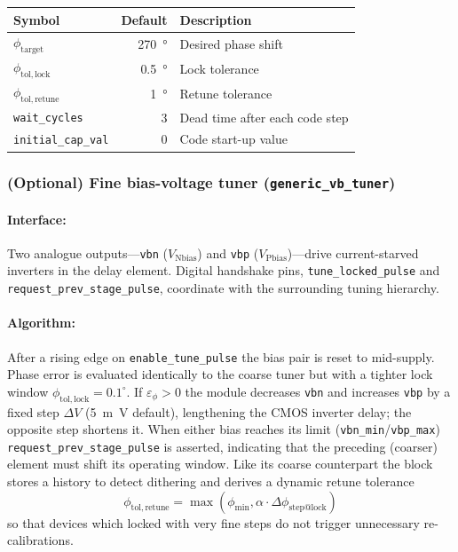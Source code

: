 \begin{center}
\begin{tabular}{@{}lrl@{}}
\toprule
Symbol & Default & Description\\
\midrule
\(\phi_\mathrm{target}\)              & \SI{270}{\degree} & Desired phase shift\\
\(\phi_\mathrm{tol,lock}\)            & \SI{0.5}{\degree} & Lock tolerance\\
\(\phi_\mathrm{tol,retune}\)          & \SI{1}{\degree}   & Retune tolerance \\[2pt]
\texttt{wait\_cycles}                 & 3                 & Dead time after each code step\\
\texttt{initial\_cap\_val}            & 0                 & Code start-up value\\
\bottomrule
\end{tabular}
\end{center}

\subsubsection{(Optional) Fine bias-voltage tuner (\texttt{generic\_vb\_tuner})}
\paragraph{Interface:}

Two analogue outputs—\texttt{vbn} (\(V_\mathrm{N bias}\)) and \texttt{vbp} (\(V_\mathrm{P bias}\))—drive current-starved inverters in the delay element.
Digital handshake pins, \texttt{tune\_locked\_pulse} and
\texttt{request\_prev\_stage\_pulse}, coordinate with the surrounding
tuning hierarchy.

\paragraph{Algorithm:}

After a rising edge on \texttt{enable\_tune\_pulse} the bias pair is reset to mid-supply.
Phase error is evaluated identically to the coarse tuner but with a
tighter lock window \(\phi_\mathrm{tol,lock}=0.1^{\circ}\).
If \(\varepsilon_\phi>0\) the module decreases \texttt{vbn} and
increases \texttt{vbp} by a fixed step \(\Delta V\)
(\SI{5}{m\volt} default), lengthening the CMOS inverter delay;
the opposite step shortens it.
When either bias reaches its limit (\texttt{vbn\_min}/\texttt{vbp\_max})
\texttt{request\_prev\_stage\_pulse} is asserted, indicating that the
preceding (coarser) element must shift its operating window.
Like its coarse counterpart the block stores a history to detect dithering and
derives a dynamic retune tolerance
\[
\phi_\mathrm{tol,retune}= \max\!\left(
                \phi_\mathrm{min},
                \alpha \cdot \Delta\!\phi_\mathrm{step@lock}
            \right)
\]
so that devices which locked with very fine steps do not trigger
unnecessary re-calibrations.

